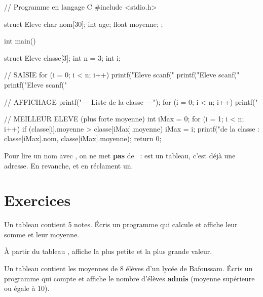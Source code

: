\begin{codec}
// Programme en langage C
#include <stdio.h>

struct Eleve {
    char nom[30];
    int age;
    float moyenne;
};

int main() {
    struct Eleve classe[3];
    int n = 3;
    int i;

    // SAISIE
    for (i = 0; i < n; i++) {
        printf("Eleve %
        scanf("%
        printf("Eleve %
        scanf("%
        printf("Eleve %
        scanf("%
    }

    // AFFICHAGE
    printf("\n--- Liste de la classe ---\n");
    for (i = 0; i < n; i++) {
        printf("%
    }

    // MEILLEUR ELEVE (plus forte moyenne)
    int iMax = 0;
    for (i = 1; i < n; i++) {
        if (classe[i].moyenne > classe[iMax].moyenne) {
            iMax = i;
        }
    }
    printf("\nMajor de la classe : %
           classe[iMax].nom, classe[iMax].moyenne);
    return 0;
}
\end{codec}


\begin{remarque}
Pour lire un nom avec , on ne met \textbf{pas} de
\code{\&}~:  est un tableau, c'est déjà une adresse. En
revanche,  et  en réclament un.
\end{remarque}

\section{Exercices}


Un tableau  contient 5 notes. Écris un
programme qui calcule et affiche leur somme et leur moyenne.

À partir du tableau , affiche la plus
petite et la plus grande valeur.

Un tableau  contient les moyennes de 8 élèves d'un lycée de
Bafoussam. Écris un programme qui compte et affiche le nombre d'élèves
\textbf{admis} (moyenne supérieure ou égale à 10).

